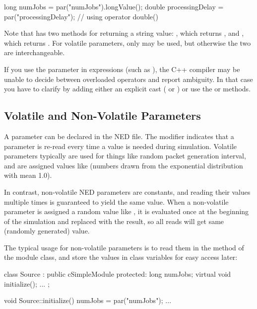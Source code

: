 \begin{cpp}
long numJobs = par("numJobs").longValue();
double processingDelay = par("processingDelay"); // using operator double()
\end{cpp}

Note that  has two methods for returning a string value:
, which returns , and
, which returns .
For volatile parameters, only  may be used,
but otherwise the two are interchangeable.

If you use the  parameter in expressions (such as
), the C++ compiler may be unable to decide
between overloaded operators and report ambiguity. In that case
you have to clarify by adding either an explicit cast
( or ) or use
the  or  methods.


\subsection{Volatile and Non-Volatile Parameters}
\label{sec:simple-modules:volatile-parameters}

A parameter can be declared  in the NED file. The 
modifier indicates that a parameter is re-read every time a value is needed
during simulation. Volatile parameters typically are used for things like
random packet generation interval, and are assigned values like 
(numbers drawn from the exponential distribution with mean 1.0).

In contrast, non-volatile NED parameters are constants, and reading their
values multiple times is guaranteed to yield the same value. When a non-volatile
parameter is assigned a random value like , it is
evaluated once at the beginning of the simulation and replaced with the result,
so all reads will get same (randomly generated) value.

The typical usage for non-volatile parameters is to read them in the
 method of the module class, and store the values
in class variables for easy access later:

\begin{cpp}
class Source : public cSimpleModule
{
  protected:
    long numJobs;
    virtual void initialize();
    ...
};

void Source::initialize()
{
    numJobs = par("numJobs");
    ...
}
\end{cpp}

